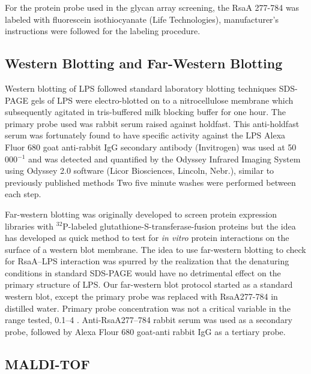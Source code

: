     For the protein probe used in the glycan array screening, the RsaA \del{}277-784 was labeled with fluorescein isothiocyanate (Life Technologies), manufacturer's instructions were followed for the labeling procedure.

        \subsection{Western Blotting and Far-Western Blotting} \label{sec:western-blotting-far}

    Western blotting of \ac{LPS} followed standard laboratory blotting techniques \ac{SDS-PAGE} gels of \ac{LPS} were electro-blotted on to a nitrocellulose membrane which subsequently agitated in tris-buffered milk blocking buffer for one hour. The primary probe used was rabbit serum raised against \caulobacter{} holdfast. This anti-holdfast serum was fortunately found to have specific activity against the \caulobacter{} \ac{LPS} Alexa Fluor 680 goat anti-rabbit IgG secondary antibody (Invitrogen) was used at 50 000$^{-1}$ and was detected and quantified by the Odyssey Infrared Imaging System using Odyssey 2.0 software (Licor Biosciences, Lincoln, Nebr.), similar to previously published methods Two five minute washes were performed between each step.

Far-western blotting was originally developed to screen protein expression libraries with $^{32}$P-labeled glutathione-S-transferase-fusion proteins but the idea has developed as quick method to test for \textit{in vitro} protein interactions on the surface of a western blot membrane. The idea to use far-western blotting to check for RsaA--\ac{LPS} interaction was spurred by the realization that the denaturing conditions in standard \ac{SDS-PAGE} would have no detrimental effect on the primary structure of \ac{LPS}. Our far-western blot protocol started as a standard western blot, except the primary probe was replaced with RsaA\del{}277-784 in distilled water. Primary probe concentration was not a critical variable in the range tested, 0.1--4 \mgperml{}. Anti-RsaA\del{}277--784 rabbit serum was used as a secondary probe, followed by Alexa Flour 680 goat-anti rabbit IgG as a tertiary probe. 

    \subsection{\Ac{MALDI-TOF}}\label{sec:acmaldi-tof}
     
